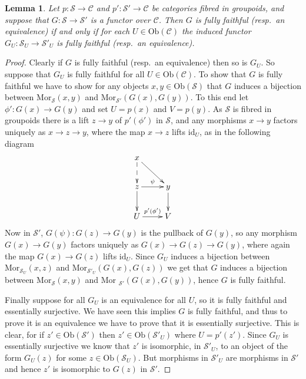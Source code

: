 \documentclass{amsart}
\newtheorem{lemma}[theorem]{Lemma}
\theoremstyle{definition}
\theoremstyle{remark}
\numberwithin{equation}{subsection}
\begin{document}
\begin{lemma}
\label{lemma-equivalence-fibred-categories}
Let $p\colon \mathcal{S}\to \mathcal{C}$ and 
$p'\colon \mathcal{S'}\to \mathcal{C}$ be categories fibred in groupoids, and
suppose that $G\colon \mathcal{S}\to \mathcal {S}'$ is a functor over 
$\mathcal{C}$.  Then $G$ is fully faithful (resp.\ an equivalence) if and only
if for each $U\in\text{Ob}(\mathcal{C})$ the induced functor 
$G_U\colon \mathcal{S}_U\to \mathcal{S}'_U$ is fully faithful (resp.\ an
equivalence).
\end{lemma}

\begin{proof}
Clearly if $G$ is fully faithful (resp.\ an equivalence) then so is $G_U$. So
suppose that $G_U$ is fully faithful for all $U\in\text{Ob}(\mathcal C)$. To
show that $G$ is fully faithful we have to show for any objects
$x,y\in\text{Ob}(\mathcal{S})$ that $G$ induces a bijection between
$\text{Mor}_{\mathcal{S}}(x,y)$ and $\text{Mor}_{\mathcal{S}'}(G(x),G(y))$. 
To this end let $\phi'\colon G(x)\to G(y)$ and set $U=p(x)$ and $V=p(y)$.
As $\mathcal{S}$ is fibred in groupoids there is a lift $z\to y$ of 
$p'(\phi')$ in $\mathcal{S}$, and any morphisms $x\to y$ factors uniquely
as $x\to z\to y$, where the map $x\to z$ lifts $\text{id}_U$, as in the
following diagram
$$
\xymatrix{
x \ar@{-->}[d] \ar[rd]  \\
z \ar[r]^\psi \ar[d] & y \ar[d] \\
U \ar[r]^{p'(\phi')} &V}
$$ 
Now in $\mathcal{S}'$,  $G(\psi)\colon G(z)\to G(y)$ is the pullback of
$G(y)$, so any morphism $G(x)\to G(y)$ factors uniquely
as $G(x)\to G(z)\to G(y)$, where again the map
$G(x)\to G(z)$ lifts $\text{id}_U$.  Since $G_U$
induces a bijection between $\text{Mor}_{\mathcal{S}_U}(x,z)$ and
$\text{Mor}_{\mathcal{S}'_U}(G(x),G(z))$ we get that
$G$ induces a bijection between $\text{Mor}_{\mathcal{S}}(x,y)$
and $\text{Mor }_{\mathcal{S}'}(G(x),G(y))$, hence $G$
is fully faithful.

\smallskip\noindent
Finally suppose for all $G_U$ is an equivalence for all $U$, so it is
fully faithful and essentially surjective.  We have seen this implies $G$ is
fully faithful, and thus to prove it is an equivalence we have to prove that
it is essentially surjective.  This is clear, for if $z'\in
\text{Ob}(\mathcal{S}')$ then $z'\in \text{Ob}(\mathcal{S}'_U)$ where
$U=p'(z')$.  Since $G_U$ is essentially surjective we know that
$z'$ is isomorphic, in $\mathcal{S}'_U$, to an object of the form
$G_U(z)$ for some $z\in \text{Ob}(\mathcal{S}_U)$.  But morphisms
in $\mathcal{S}'_U$ are morphisms in $\mathcal{S}'$ and hence $z'$ is
isomorphic to $G(z)$ in $\mathcal{S}'$.
\end{proof}
\end{document}
